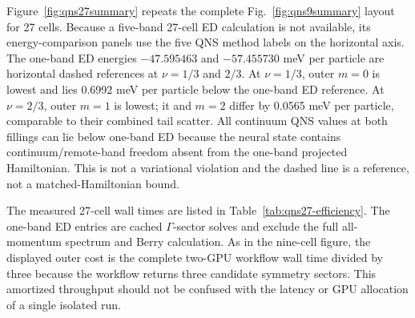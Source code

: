 Figure~\ref{fig:qns27summary} repeats the complete Fig.~\ref{fig:qns9summary}
layout for 27 cells.  Because a five-band 27-cell ED calculation is not
available, its energy-comparison panels use the five QNS method labels on the
horizontal axis.  The one-band ED energies $-47.595463$ and $-57.455730$ meV
per particle are horizontal dashed references at $\nu=1/3$ and $2/3$.
At $\nu=1/3$, outer $m=0$ is lowest and lies 0.6992 meV per particle below
the one-band ED reference.  At $\nu=2/3$, outer $m=1$ is lowest; it and
$m=2$ differ by 0.0565 meV per particle, comparable to their combined tail
scatter.  All continuum QNS values at both fillings can lie below one-band ED
because the neural state contains continuum/remote-band freedom absent from
the one-band projected Hamiltonian.  This is not a variational violation and
the dashed line is a reference, not a matched-Hamiltonian bound.

The measured 27-cell wall times are listed in
Table~\ref{tab:qns27-efficiency}.  The one-band ED entries are cached
$\Gamma$-sector solves and exclude the full all-momentum spectrum and Berry
calculation.  As in the nine-cell figure, the displayed outer cost is the
complete two-GPU workflow wall time divided by three because the workflow
returns three candidate symmetry sectors.  This amortized throughput should
not be confused with the latency or GPU allocation of a single isolated run.

\begin{table}[H]
\centering
\caption{Twenty-seven-cell ED/QNS timing. QNS rows are complete 240-update training
jobs. Outer wall time is the observed two-GPU critical path; allocated GPU
time sums both lanes.}
\label{tab:qns27-efficiency}
\end{table}


